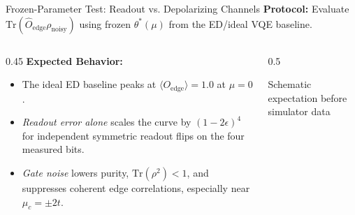 \documentclass[aspectratio=169,12pt]{beamer}
\begin{document}
\begin{frame}{Frozen-Parameter Test: Readout vs. Depolarizing Channels}
    \textbf{Protocol:} Evaluate $\text{Tr}(\hat{O}_{\text{edge}} \rho_{\text{noisy}})$ using frozen $\theta^*(\mu)$ from the ED/ideal VQE baseline.
    
    \vspace{0.2cm}
    \begin{columns}
        \begin{column}{0.45\textwidth}
            \textbf{Expected Behavior:}
            \begin{itemize}
                \item The ideal ED baseline peaks at $\langle O_{\text{edge}} \rangle = 1.0$ at $\mu=0$.
                \item \textit{Readout error alone} scales the curve by $(1-2\epsilon)^4$ for independent symmetric readout flips on the four measured bits.
                \item \textit{Gate noise} lowers purity, $\text{Tr}(\rho^2)<1$, and suppresses coherent edge correlations, especially near $\mu_c=\pm2t$.
            \end{itemize}
        \end{column}
        \begin{column}{0.5\textwidth}
            \begin{center}
            \scriptsize Schematic expectation before simulator data
            \vspace{0.1cm}

            \end{center}
        \end{column}
    \end{columns}
\end{frame}
\end{document}
